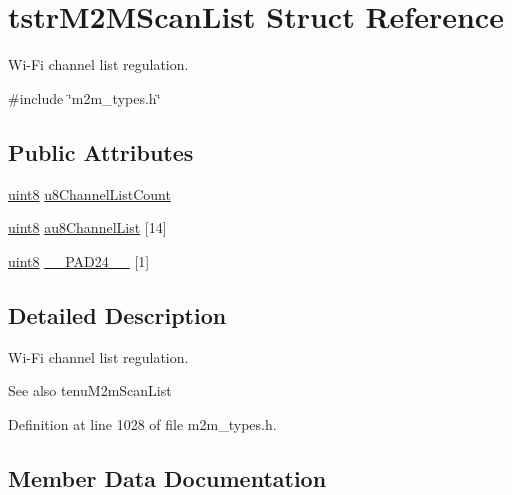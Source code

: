 \hypertarget{structtstrM2MScanList}{}\section{tstr\+M2\+M\+Scan\+List Struct Reference}
\label{structtstrM2MScanList}


Wi-\/\+Fi channel list regulation.  




{\ttfamily \#include \char`\"{}m2m\+\_\+types.\+h\char`\"{}}

\subsection*{Public Attributes}
\begin{DoxyCompactItemize}
\item 
\hyperlink{group__DataT_ga4df709a77647e870bbf1d955b8edc9a6}{uint8} \hyperlink{structtstrM2MScanList_a7e3314bc6fe1cea6d11cad79e8ccc718}{u8\+Channel\+List\+Count}
\item 
\hyperlink{group__DataT_ga4df709a77647e870bbf1d955b8edc9a6}{uint8} \hyperlink{structtstrM2MScanList_a1d1bee15f0031a67bd71555d2671e931}{au8\+Channel\+List} \mbox{[}14\mbox{]}
\item 
\hyperlink{group__DataT_ga4df709a77647e870bbf1d955b8edc9a6}{uint8} \hyperlink{structtstrM2MScanList_a5df58d2ddb31056523cce8e5a5c44e85}{\+\_\+\+\_\+\+P\+A\+D24\+\_\+\+\_\+} \mbox{[}1\mbox{]}
\end{DoxyCompactItemize}


\subsection{Detailed Description}
Wi-\/\+Fi channel list regulation. 

\begin{DoxySeeAlso}{See also}
tenu\+M2m\+Scan\+List 
\end{DoxySeeAlso}


Definition at line 1028 of file m2m\+\_\+types.\+h.



\subsection{Member Data Documentation}
\mbox{\label{structtstrM2MScanList_a5df58d2ddb31056523cce8e5a5c44e85}} 
